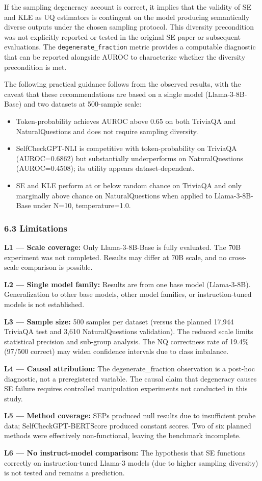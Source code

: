 If the sampling degeneracy account is correct, it implies that the validity of SE and KLE as UQ estimators is contingent on the model producing semantically diverse outputs under the chosen sampling protocol. This diversity precondition was not explicitly reported or tested in the original SE paper or subsequent evaluations. The \texttt{degenerate_fraction} metric provides a computable diagnostic that can be reported alongside AUROC to characterize whether the diversity precondition is met.

The following practical guidance follows from the observed results, with the caveat that these recommendations are based on a single model (Llama-3-8B-Base) and two datasets at 500-sample scale:

\begin{itemize}
\item Token-probability achieves AUROC above 0.65 on both TriviaQA and NaturalQuestions and does not require sampling diversity.
\item SelfCheckGPT-NLI is competitive with token-probability on TriviaQA (AUROC=0.6862) but substantially underperforms on NaturalQuestions (AUROC=0.4508); its utility appears dataset-dependent.
\item SE and KLE perform at or below random chance on TriviaQA and only marginally above chance on NaturalQuestions when applied to Llama-3-8B-Base under N=10, temperature=1.0.
\end{itemize}

\subsubsection{6.3 Limitations}

\textbf{L1 — Scale coverage:} Only Llama-3-8B-Base is fully evaluated. The 70B experiment was not completed. Results may differ at 70B scale, and no cross-scale comparison is possible.

\textbf{L2 — Single model family:} Results are from one base model (Llama-3-8B). Generalization to other base models, other model families, or instruction-tuned models is not established.

\textbf{L3 — Sample size:} 500 samples per dataset (versus the planned 17,944 TriviaQA test and 3,610 NaturalQuestions validation). The reduced scale limits statistical precision and sub-group analysis. The NQ correctness rate of 19.4\% (97/500 correct) may widen confidence intervals due to class imbalance.

\textbf{L4 — Causal attribution:} The degenerate_fraction observation is a post-hoc diagnostic, not a preregistered variable. The causal claim that degeneracy causes SE failure requires controlled manipulation experiments not conducted in this study.

\textbf{L5 — Method coverage:} SEPs produced null results due to insufficient probe data; SelfCheckGPT-BERTScore produced constant scores. Two of six planned methods were effectively non-functional, leaving the benchmark incomplete.

\textbf{L6 — No instruct-model comparison:} The hypothesis that SE functions correctly on instruction-tuned Llama-3 models (due to higher sampling diversity) is not tested and remains a prediction.

